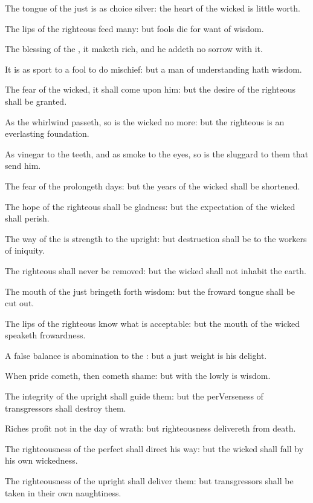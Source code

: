 \Verse The tongue of the just is as choice silver: the heart of the wicked is little worth.

\Verse The lips of the righteous feed many: but fools die for want of wisdom.

\Verse The blessing of the \LORD, it maketh rich, and he addeth no sorrow with it.

\Verse It is as sport to a fool to do mischief: but a man of understanding hath wisdom.

\Verse The fear of the wicked, it shall come upon him: but the desire of the righteous shall be granted.

\Verse As the whirlwind passeth, so is the wicked no more: but the righteous is an everlasting foundation.

\Verse As vinegar to the teeth, and as smoke to the eyes, so is the sluggard to them that send him.

\Verse The fear of the \LORD prolongeth days: but the years of the wicked shall be shortened.

\Verse The hope of the righteous shall be gladness: but the expectation of the wicked shall perish.

\Verse The way of the \LORD is strength to the upright: but destruction shall be to the workers of iniquity.

\Verse The righteous shall never be removed: but the wicked shall not inhabit the earth.

\Verse The mouth of the just bringeth forth wisdom: but the froward tongue shall be cut out.

\Verse The lips of the righteous know what is acceptable: but the mouth of the wicked speaketh frowardness.


\Chapter
\Verse A false balance is abomination to the \LORD: but a just weight is his delight.

\Verse When pride cometh, then cometh shame: but with the lowly is wisdom.

\Verse The integrity of the upright shall guide them: but the perVerseness of transgressors shall destroy them.

\Verse Riches profit not in the day of wrath: but righteousness delivereth from death.

\Verse The righteousness of the perfect shall direct his way: but the wicked shall fall by his own wickedness.

\Verse The righteousness of the upright shall deliver them: but transgressors shall be taken in their own naughtiness.


